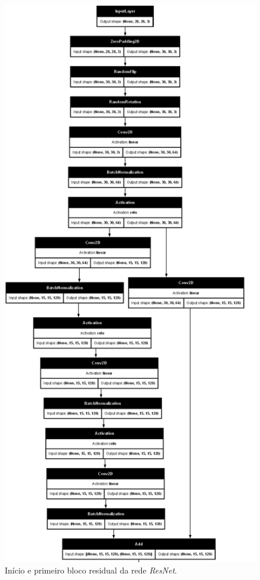 \documentclass[final,5p]{elsarticle}
\numberwithin{equation}{section}
\begin{document}
\begin{figure}[H]
    \includegraphics[width=0.95\columnwidth]{ResNet_model_upper.png}
    \caption{Início e primeiro bloco residual da rede \emph{ResNet}.}\label{fig:ModeloCNNupper}
\end{figure}
\end{document}
